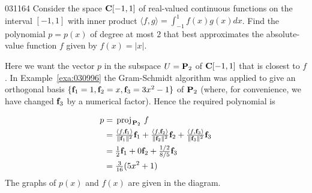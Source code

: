 \begin{example}{}{031164}
Consider the space $\textbf{C}[-1, 1]$ of real-valued continuous functions on the interval $[-1, 1]$ with inner product $\langle f, g \rangle = \int_{-1}^{1} f(x)g(x)dx $. Find the polynomial $p = p(x)$ of degree at most $2$ that best approximates the absolute-value function $f$ given by $f(x) = |x|$.

\begin{solution}
Here we want the vector $p$ in the subspace $U = \textbf{P}_{2}$ of $\textbf{C}[-1, 1]$ that is closest to $f$. In Example~\ref{exa:030996} the Gram-Schmidt algorithm was applied to give an orthogonal basis $\{\textbf{f}_{1} = 1, \textbf{f}_{2} = x, \textbf{f}_{3} = 3x^{2} - 1\}$ of $\textbf{P}_{2}$ (where, for convenience, we have changed $\textbf{f}_{3}$ by a numerical factor). Hence the required polynomial is

\newpage
\begin{wrapfigure}[5]{l}{5cm} 
\centering

\end{wrapfigure}
\setlength{\rightskip}{0pt plus 200pt}
\vspace*{-2em}\begin{align*}
p &= \thinspace\operatorname{proj\medspace}_{\!\textbf{P}_2}\,{f} \\
&= \tfrac{\langle f, \textbf{f}_1 \rangle}{\| \textbf{f}_1 \| ^2} \textbf{f}_1 +
\tfrac{\langle f, \textbf{f}_2 \rangle}{\| \textbf{f}_2 \| ^2} \textbf{f}_2 + 
\tfrac{\langle f, \textbf{f}_3 \rangle}{\| \textbf{f}_3 \| ^2} \textbf{f}_3 \\
&= \tfrac{1}{2}\textbf{f}_1 + 0\textbf{f}_2 + \tfrac{1/2}{8/5}\textbf{f}_3 \\
&= \tfrac{3}{16}(5x^2 + 1)
\end{align*}
The graphs of $p(x)$ and $f(x)$ are given in the diagram.
\end{solution}
\end{example}

